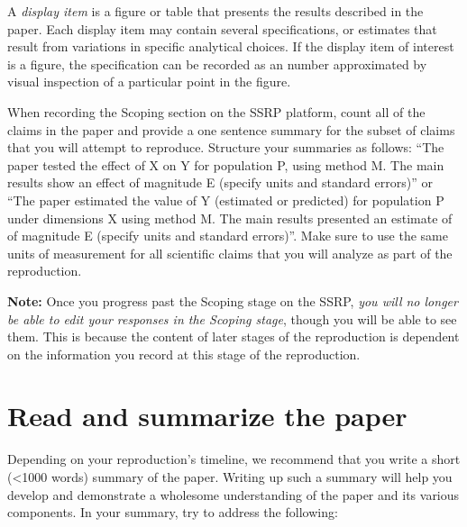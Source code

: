 \documentclass[
  openany]{book}
\begin{document}
A \emph{display item} is a figure or table that presents the results described in the paper. Each display item may contain several specifications, or estimates that result from variations in specific analytical choices. If the display item of interest is a figure, the specification can be recorded as an number approximated by visual inspection of a particular point in the figure.

When recording the Scoping section on the SSRP platform, count all of the claims in the paper and provide a one sentence summary for the subset of claims that you will attempt to reproduce. Structure your summaries as follows: ``The paper tested the effect of X on Y for population P, using method M. The main results show an effect of magnitude E (specify units and standard errors)'' or ``The paper estimated the value of Y (estimated or predicted) for population P under dimensions X using method M. The main results presented an estimate of of magnitude E (specify units and standard errors)''. Make sure to use the same units of measurement for all scientific claims that you will analyze as part of the reproduction.

\textbf{Note:} Once you progress past the Scoping stage on the SSRP, \emph{you will no longer be able to edit your responses in the Scoping stage}, though you will be able to see them. This is because the content of later stages of the reproduction is dependent on the information you record at this stage of the reproduction.

\hypertarget{read-sum}{%
\section{Read and summarize the paper}\label{read-sum}}

Depending on your reproduction's timeline, we recommend that you write a short (\textless1000 words) summary of the paper. Writing up such a summary will help you develop and demonstrate a wholesome understanding of the paper and its various components. In your summary, try to address the following:
\end{document}
